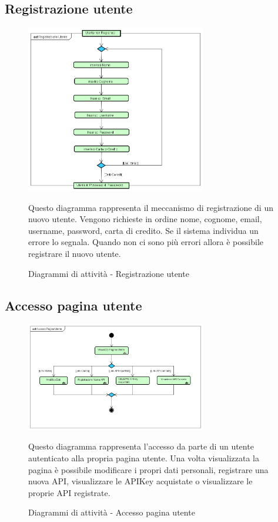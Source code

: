{	\subsection{Registrazione utente}{
		\begin{figure}[ht]
			\centering
			\includegraphics[width=0.7\textwidth]{img/registrazioneUtente}
			\caption{Diagrammi di attività - Registrazione utente}
			Questo diagramma rappresenta il meccanismo di registrazione di un nuovo utente. Vengono richieste in ordine nome, cognome, email, username, password, carta di credito. Se il sistema individua un errore lo segnala. Quando non ci sono più errori allora è possibile registrare il nuovo utente. 
		\end{figure}
	}
	\subsection{Accesso pagina utente}{
		\begin{figure}[ht]
			\centering
			\includegraphics[width=0.7\textwidth]{img/accessoPaginaUtente}
			\caption{Diagrammi di attività - Accesso pagina utente}
			Questo diagramma rappresenta l'accesso da parte di un utente autenticato alla propria pagina utente. Una volta visualizzata la pagina è possibile modificare i propri dati personali, registrare una nuova API, visualizzare le APIKey acquistate o visualizzare le proprie API registrate. 
		\end{figure}
	}
}
